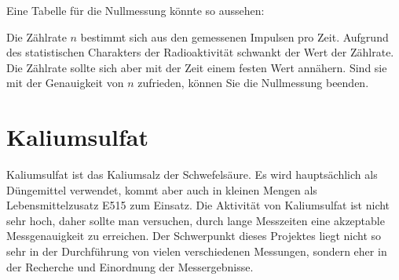 \documentclass[12pt,a4paper, twosite]{article}
\begin{document}
Eine Tabelle für die Nullmessung könnte so aussehen:

\usetikzlibrary{matrix}


Die Zählrate $n$ bestimmt sich aus den gemessenen Impulsen pro Zeit.
Aufgrund des statistischen Charakters der Radioaktivität schwankt der Wert der Zählrate. Die Zählrate sollte sich aber mit der Zeit einem
festen Wert annähern. Sind sie mit der Genauigkeit von $n$ zufrieden, können Sie die Nullmessung beenden.

\section*{Kaliumsulfat}
Kaliumsulfat ist das Kaliumsalz der Schwefelsäure. Es wird hauptsächlich als Düngemittel verwendet, kommt aber auch
in kleinen Mengen als Lebensmittelzusatz E515 zum Einsatz.
Die Aktivität von Kaliumsulfat ist nicht sehr hoch, daher sollte man versuchen, durch lange Messzeiten 
eine akzeptable Messgenauigkeit zu erreichen. Der Schwerpunkt dieses Projektes liegt nicht so sehr in
der Durchführung von vielen verschiedenen Messungen, sondern eher in der Recherche und Einordnung der Messergebnisse. 
\end{document}
